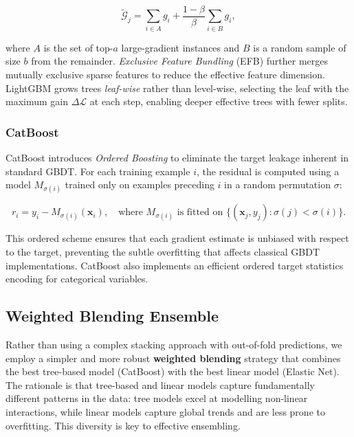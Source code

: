 \begin{equation}
  \tilde{\mathcal{G}}_j = \sum_{i \in A} g_i
    + \frac{1-\beta}{\beta} \sum_{i \in B} g_i,
  \label{eq:goss}
\end{equation}

where $A$ is the set of top-$a$ large-gradient instances and $B$ is a random
sample of size $b$ from the remainder.
\textit{Exclusive Feature Bundling} (EFB) further merges mutually exclusive
sparse features to reduce the effective feature dimension.
LightGBM grows trees \emph{leaf-wise} rather than level-wise,
selecting the leaf with the maximum gain $\Delta\mathcal{L}$ at each step,
enabling deeper effective trees with fewer splits.

\subsubsection{CatBoost}

CatBoost introduces \textit{Ordered Boosting} to
eliminate the target leakage inherent in standard GBDT.
For each training example $i$, the residual is computed using a model
$M_{\sigma(i)}$ trained only on examples preceding $i$ in a random
permutation $\sigma$:

\begin{equation}
  r_i = y_i - M_{\sigma(i)}(\mathbf{x}_i),
  \quad \text{where } M_{\sigma(i)} \text{ is fitted on }
  \{(\mathbf{x}_j, y_j) : \sigma(j) < \sigma(i)\}.
  \label{eq:catboost}
\end{equation}

This ordered scheme ensures that each gradient estimate is unbiased
with respect to the target, preventing the subtle overfitting that affects
classical GBDT implementations.
CatBoost also implements an efficient ordered target statistics encoding
for categorical variables.

\subsection{Weighted Blending Ensemble}

Rather than using a complex stacking approach with out-of-fold predictions,
we employ a simpler and more robust \textbf{weighted blending} strategy
that combines the best tree-based model (CatBoost) with the best linear model
(Elastic Net). The rationale is that tree-based and linear models capture
fundamentally different patterns in the data: tree models excel at modelling
non-linear interactions, while linear models capture global trends and are
less prone to overfitting. This diversity is key to effective ensembling.


